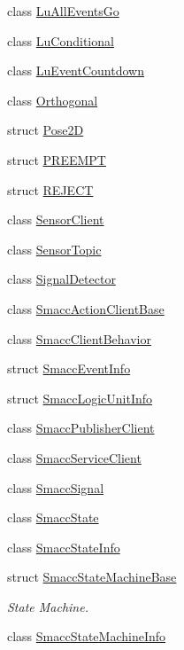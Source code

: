 \begin{DoxyCompactItemize}
class \hyperlink{classsmacc_1_1LuAllEventsGo}{Lu\+All\+Events\+Go}
\item 
class \hyperlink{classsmacc_1_1LuConditional}{Lu\+Conditional}
\item 
class \hyperlink{classsmacc_1_1LuEventCountdown}{Lu\+Event\+Countdown}
\item 
class \hyperlink{classsmacc_1_1Orthogonal}{Orthogonal}
\item 
struct \hyperlink{structsmacc_1_1Pose2D}{Pose2D}
\item 
struct \hyperlink{structsmacc_1_1PREEMPT}{P\+R\+E\+E\+M\+PT}
\item 
struct \hyperlink{structsmacc_1_1REJECT}{R\+E\+J\+E\+CT}
\item 
class \hyperlink{classsmacc_1_1SensorClient}{Sensor\+Client}
\item 
class \hyperlink{classsmacc_1_1SensorTopic}{Sensor\+Topic}
\item 
class \hyperlink{classsmacc_1_1SignalDetector}{Signal\+Detector}
\item 
class \hyperlink{classsmacc_1_1SmaccActionClientBase}{Smacc\+Action\+Client\+Base}
\item 
class \hyperlink{classsmacc_1_1SmaccClientBehavior}{Smacc\+Client\+Behavior}
\item 
struct \hyperlink{structsmacc_1_1SmaccEventInfo}{Smacc\+Event\+Info}
\item 
struct \hyperlink{structsmacc_1_1SmaccLogicUnitInfo}{Smacc\+Logic\+Unit\+Info}
\item 
class \hyperlink{classsmacc_1_1SmaccPublisherClient}{Smacc\+Publisher\+Client}
\item 
class \hyperlink{classsmacc_1_1SmaccServiceClient}{Smacc\+Service\+Client}
\item 
class \hyperlink{classsmacc_1_1SmaccSignal}{Smacc\+Signal}
\item 
class \hyperlink{classsmacc_1_1SmaccState}{Smacc\+State}
\item 
class \hyperlink{classsmacc_1_1SmaccStateInfo}{Smacc\+State\+Info}
\item 
struct \hyperlink{structsmacc_1_1SmaccStateMachineBase}{Smacc\+State\+Machine\+Base}
\begin{DoxyCompactList}\small\item\em State Machine. \end{DoxyCompactList}\item 
class \hyperlink{classsmacc_1_1SmaccStateMachineInfo}{Smacc\+State\+Machine\+Info}
\item 

\end{DoxyCompactItemize}
